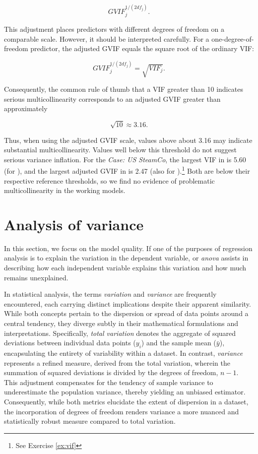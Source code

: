 \[
GVIF_j^{1/(2df_j)}.
\]

This adjustment places predictors with different degrees of freedom on a comparable scale. However, it should be interpreted carefully. For a one-degree-of-freedom predictor, the adjusted GVIF equals the square root of the ordinary VIF:

\[
GVIF_j^{1/(2df_j)} = \sqrt{VIF_j}.
\]

Consequently, the common rule of thumb that a VIF greater than 10 indicates serious multicollinearity corresponds to an adjusted GVIF greater than approximately

\[
\sqrt{10} \approx 3.16.
\]

Thus, when using the adjusted GVIF scale, values above about 3.16 may indicate substantial multicollinearity. Values well below this threshold do not suggest serious variance inflation.
For the \emph{Case: US SteamCo}, the largest VIF in  is 5.60 (for ), and the largest adjusted GVIF in  is 2.47 (also for ).\footnote{See Exercise \ref{ex:vif}} Both are below their respective reference thresholds, so we find no evidence of problematic multicollinearity in the working models.




\section{Analysis of variance} %
\label{sec:analysis_of_variance}

In this section, we focus on the model quality. If one of the purposes of regression analysis is to explain the variation in the dependent variable,  or \emph{anova} assists in describing how each independent variable explains this variation and how much remains unexplained. 

In statistical analysis, the terms \emph{variation} and \emph{variance} are frequently encountered, each carrying distinct implications despite their apparent similarity. While both concepts pertain to the dispersion or spread of data points around a central tendency, they diverge subtly in their mathematical formulations and interpretations. Specifically, \emph{total variation} denotes the aggregate of squared deviations between individual data points ($y_i$) and the sample mean ($\bar{y}$), encapsulating the entirety of variability within a dataset. In contrast, \emph{variance} represents a refined measure, derived from the total variation, wherein the summation of squared deviations is divided by the degrees of freedom, $n - 1$. This adjustment compensates for the tendency of sample variance to underestimate the population variance, thereby yielding an unbiased estimator. Consequently, while both metrics elucidate the extent of dispersion in a dataset, the incorporation of degrees of freedom renders variance a more nuanced and statistically robust measure compared to total variation.

